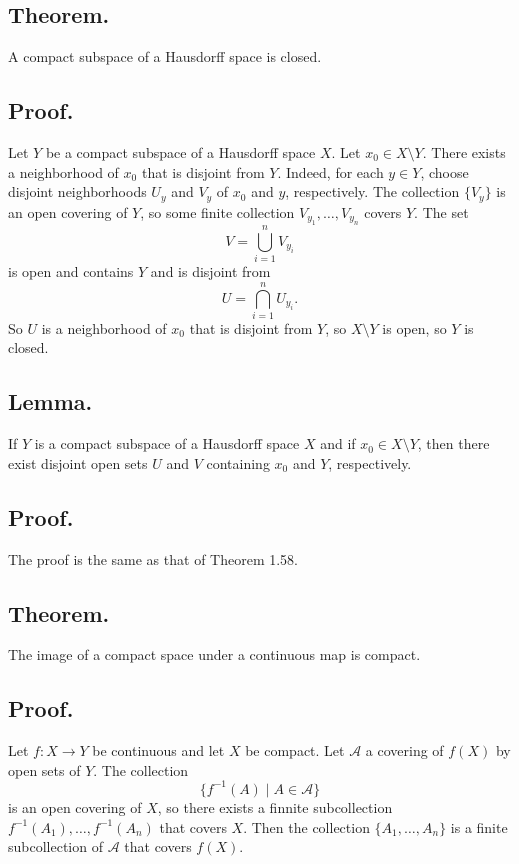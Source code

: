 \documentclass[titlepage]{article}
\begin{document}
\subsection{Theorem.} A compact subspace of a Hausdorff space is closed.

\subsection{Proof.} Let $Y$ be a compact subspace of a Hausdorff space $X$. Let $x_{0} \in X \setminus Y$. There exists a neighborhood of $x_{0}$ that is disjoint from $Y$. Indeed, for each $y \in Y$, choose disjoint neighborhoods $U_{y}$ and $V_{y}$ of $x_{0}$ and $y$, respectively. The collection $\{V_{y}\}$ is an open covering of $Y$, so some finite collection $V_{y_{1}}, \ldots, V_{y_{n}}$ covers $Y$. The set 
$$V = \bigcup_{i=1}^{n} V_{y_{i}}$$
is open and contains $Y$ and is disjoint from 
$$U = \bigcap_{i=1}^{n} U_{y_{i}}.$$
So $U$ is a neighborhood of $x_{0}$ that is disjoint from $Y$, so $X \setminus Y$ is open, so $Y$ is closed.

\subsection{Lemma.} If $Y$ is a compact subspace of a Hausdorff space $X$ and if $x_{0} \in X \setminus Y$, then there exist disjoint open sets $U$ and $V$ containing $x_{0}$ and $Y$, respectively.

\subsection{Proof.} The proof is the same as that of Theorem 1.58.

\subsection{Theorem.} The image of a compact space under a continuous map is compact.

\subsection{Proof.} Let $f: X \to Y$ be continuous and let $X$ be compact. Let $\mathcal{A}$ a covering of $f(X)$ by open sets of $Y$. The collection 
$$\{f^{-1}(A) \mid A \in \mathcal{A}\}$$
is an open covering of $X$, so there exists a finnite subcollection $f^{-1}(A_{1}), \ldots, f^{-1}(A_{n})$ that covers $X$. Then the collection $\{A_{1}, \ldots, A_{n}\}$ is a finite subcollection of $\mathcal{A}$ that covers $f(X)$.
\end{document}
